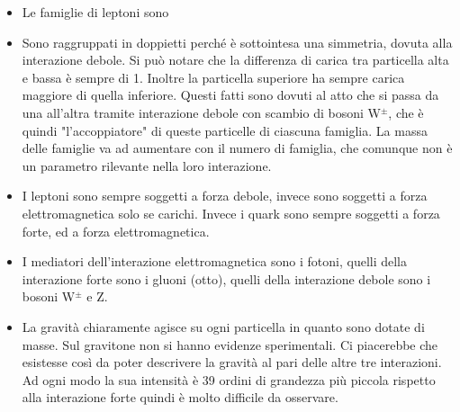 \begin{itemize}
    \item Le famiglie di leptoni sono 
    \item Sono raggruppati in doppietti perché è sottointesa una simmetria, dovuta alla interazione debole. Si può notare che la differenza di carica tra particella alta e bassa è sempre di 1. Inoltre la particella superiore ha sempre carica maggiore di quella inferiore. Questi fatti sono dovuti al atto che si passa da una all'altra tramite interazione debole con scambio di bosoni W$^\pm$, che è quindi "l'accoppiatore" di queste particelle di ciascuna famiglia. La massa delle famiglie va ad aumentare con il numero di famiglia, che comunque non è un parametro rilevante nella loro interazione.
    \item I leptoni sono sempre soggetti a forza debole, invece sono soggetti a forza elettromagnetica solo se carichi. Invece i quark sono sempre soggetti a forza forte, ed a forza elettromagnetica.
    \item I mediatori dell'interazione elettromagnetica sono i fotoni, quelli della interazione forte sono i gluoni (otto), quelli della interazione debole sono i bosoni W$^\pm$ e Z.
    \item La gravità chiaramente agisce su ogni particella in quanto sono dotate di masse. Sul gravitone non si hanno evidenze sperimentali. Ci piacerebbe che esistesse così da poter descrivere la gravità al pari delle altre tre interazioni. Ad ogni modo la sua intensità è 39 ordini di grandezza più piccola rispetto alla interazione forte quindi è molto difficile da osservare.
\end{itemize}

